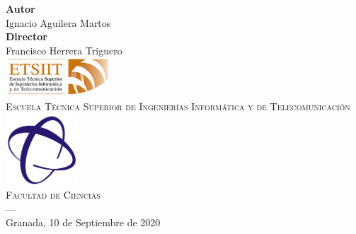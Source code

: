 \begin{titlepage}
\begin{minipage}{\textwidth}
\textbf{Autor}\\ {Ignacio Aguilera Martos}\\[2.5ex]
\textbf{Director}\\
{Francisco Herrera Triguero}\\[2cm]
\includegraphics[width=0.3\textwidth]{imagenes/logos/etsiit_logo.png}\\[0.1cm]
\textsc{Escuela Técnica Superior de Ingenierías Informática y de Telecomunicación}\\
\includegraphics[width=0.2\textwidth]{imagenes/logos/ciencias.png}\\[0.1cm]
\textsc{Facultad de Ciencias}\\
\textsc{---}\\
Granada, 10 de Septiembre de 2020
\end{minipage}
\end{titlepage}


